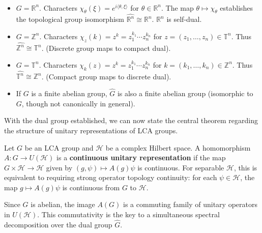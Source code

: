 \begin{example}\,
\begin{itemize}
    \item $G = \mathbb{R}^n$. Characters $\chi_\theta(\xi) = e^{i \langle \theta, \xi \rangle}$ for $\theta \in \mathbb{R}^n$. The map $\theta \mapsto \chi_\theta$ establishes the topological group isomorphism $\hat{\mathbb{R}^n} \cong \mathbb{R}^n$. $\mathbb{R}^n$ is self-dual.
    \item $G = \mathbb{Z}^n$. Characters $\chi_z(k) = z^k = z_1^{k_1} \cdots z_n^{k_n}$ for $z=(z_1, \dots, z_n) \in \mathbb{T}^n$. Thus $\hat{\mathbb{Z}^n} \cong \mathbb{T}^n$. (Discrete group maps to compact dual).
    \item $G = \mathbb{T}^n$. Characters $\chi_k(z) = z^k = z_1^{k_1} \cdots z_n^{k_n}$ for $k=(k_1, \dots, k_n) \in \mathbb{Z}^n$. Thus $\hat{\mathbb{T}^n} \cong \mathbb{Z}^n$. (Compact group maps to discrete dual).
    \item If $G$ is a finite abelian group, $\hat{G}$ is also a finite abelian group (isomorphic to $G$, though not canonically in general).
\end{itemize}
\end{example}

With the dual group established, we can now state the central theorem regarding the structure of unitary representations of LCA groups.

\begin{definition}
Let $G$ be an LCA group and $\mathcal{H}$ be a complex Hilbert space. A homomorphism $A: G \to U(\mathcal{H})$ is a \textbf{continuous unitary representation} if the map $G \times \mathcal{H} \to \mathcal{H}$ given by $(g, \psi) \mapsto A(g)\psi$ is continuous. For separable $\mathcal{H}$, this is equivalent to requiring strong operator topology continuity: for each $\psi \in \mathcal{H}$, the map $g \mapsto A(g)\psi$ is continuous from $G$ to $\mathcal{H}$.
\end{definition}

Since $G$ is abelian, the image $A(G)$ is a commuting family of unitary operators in $U(\mathcal{H})$. This commutativity is the key to a simultaneous spectral decomposition over the dual group $\hat{G}$.

